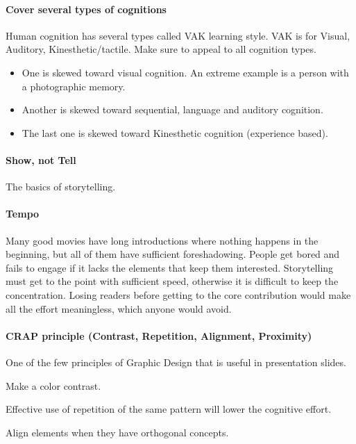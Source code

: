 \paragraph{Cover several types of cognitions}

Human cognition has several types called VAK learning style.
VAK is for Visual, Auditory, Kinesthetic/tactile.
Make sure to appeal to all cognition types.

\begin{itemize}
 \item One is skewed toward visual cognition. An extreme example is a person with a photographic memory.
 \item Another is skewed toward sequential, language and auditory cognition.
 \item The last one is skewed toward Kinesthetic cognition (experience based).
\end{itemize}

\paragraph{Show, not Tell}

The basics of storytelling.

\paragraph{Tempo}

Many good movies have long introductions where nothing happens in the beginning, but all of them have sufficient foreshadowing.
People get bored and fails to engage if it lacks the elements that keep them interested.
Storytelling must get to the point with sufficient speed, otherwise it is difficult to keep the concentration.
Losing readers before getting to the core contribution would make all the effort meaningless, which anyone would avoid.

\paragraph{CRAP principle (Contrast, Repetition, Alignment, Proximity)}

One of the few principles of Graphic Design that is useful in presentation slides.

Make a color contrast.

Effective use of repetition of the same pattern
will lower the cognitive effort.

Align elements when they have orthogonal concepts.

